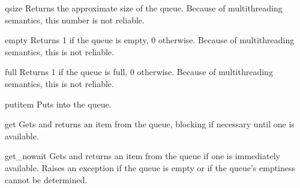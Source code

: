 \renewcommand{\indexsubitem}{(qsize method)}

\begin{funcdesc}{qsize}{}
Returns the approximate size of the queue.  Because of multithreading
semantics, this number is not reliable.
\end{funcdesc}

\renewcommand{\indexsubitem}{(empty method)}

\begin{funcdesc}{empty}{}
Returns 1 if the queue is empty, 0 otherwise.  Because of
multithreading semantics, this is not reliable.
\end{funcdesc}

\renewcommand{\indexsubitem}{(full method)}

\begin{funcdesc}{full}{}
Returns 1 if the queue is full, 0 otherwise.  Because of
multithreading semantics, this is not reliable.
\end{funcdesc}

\renewcommand{\indexsubitem}{(put method)}

\begin{funcdesc}{put}{item}
Puts  into the queue.
\end{funcdesc}

\renewcommand{\indexsubitem}{(get method)}

\begin{funcdesc}{get}{}
Gets and returns an item from the queue, blocking if necessary until
one is available.
\end{funcdesc}

\renewcommand{\indexsubitem}{(get_nowait method)}

\begin{funcdesc}{get_nowait}{}
Gets and returns an item from the queue if one is immediately
available.  Raises an  exception if the queue is empty or
if the queue's emptiness cannot be determined.
\end{funcdesc}
